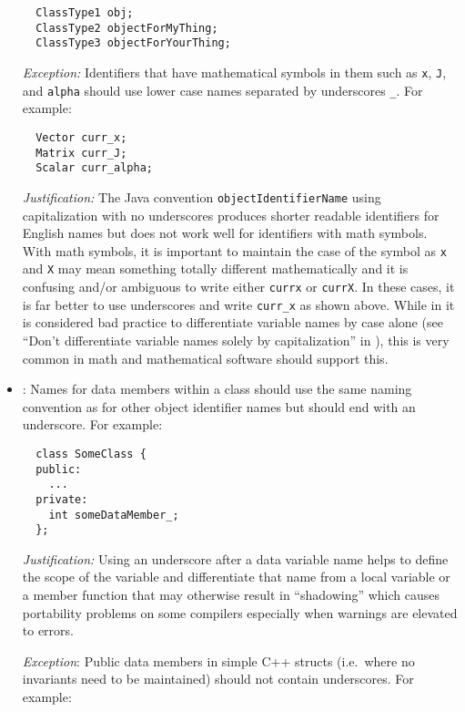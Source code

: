 \begin{itemize}
{\small\begin{verbatim}
  ClassType1 obj;
  ClassType2 objectForMyThing;
  ClassType3 objectForYourThing;
\end{verbatim}}


{}\textit{Exception:} Identifiers that have mathematical symbols in them such
as {}\texttt{x}, {}\texttt{J}, and {}\texttt{alpha} should use lower case
names separated by underscores {}\texttt{\_}.  For example:

{\small\begin{verbatim}
  Vector curr_x;
  Matrix curr_J;
  Scalar curr_alpha;
\end{verbatim}}


{}\textit{Justification:} The Java convention {}\texttt{objectIdentifierName}
using capitalization with no underscores produces shorter readable identifiers
for English names but does not work well for identifiers with math symbols.
With math symbols, it is important to maintain the case of the symbol as
{}\texttt{x} and {}\texttt{X} may mean something totally different
mathematically and it is confusing and/or ambiguous to write either
{}\texttt{currx} or {}\texttt{currX}.  In these cases, it is far better to use
underscores and write {}\texttt{curr\_x} as shown above.  While in it is
considered bad practice to differentiate variable names by case alone (see
``Don't differentiate variable names solely by capitalization'' in
{}\cite[Section 11.7]{CodeComplete2nd04}), this is very common in math and
mathematical software should support this.


{}\item\NCDataMemberNames: Names for data members within a class should use the
same naming convention as for other object identifier names but should end
with an underscore.  For example:

{\small\begin{verbatim}
  class SomeClass {
  public:
    ...
  private:
    int someDataMember_;
  };
\end{verbatim}}


{}\textit{Justification:} Using an underscore after a data variable
name helps to define the scope of the variable and differentiate that
name from a local variable or a member function that may otherwise
result in ``shadowing'' which causes portability problems on some
compilers especially when warnings are elevated to errors.


{}\textit{Exception}: Public data members in simple C++ structs (i.e.\
where no invariants need to be maintained) should not contain
underscores.  For example:


\end{itemize}
